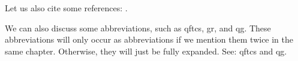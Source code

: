 \kant[1-3]

Let us also cite some references: \textcite{aguiaralves2023NonperturbativeAspectsQuantum,codello2010NovelFunctionalRenormalization,donoghue2012EffectiveFieldTheory,hawking1975ParticleCreationBlack,khavkine2015AlgebraicQFTCurved,wald1994QuantumFieldTheory,weinberg1995QuantumTheoryFieldsSeries}.

We can also discuss some abbreviations, such as \gls{qftcs}, \gls{gr}, and \gls{qg}. These abbreviations will only occur as abbreviations if we mention them twice in the same chapter. Otherwise, they will just be fully expanded. See: \gls{qftcs} and \gls{qg}.